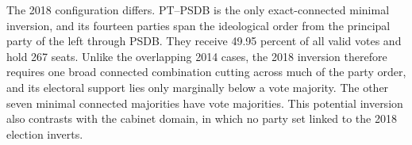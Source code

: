 \documentclass[11pt]{article}
\begin{document}

The 2018 configuration differs. PT--PSDB is the only exact-connected
minimal inversion, and its fourteen parties span the ideological order from
the principal party of the left through PSDB. They receive 49.95 percent of
all valid votes and hold 267 seats. Unlike the overlapping 2014 cases, the
2018 inversion therefore requires one broad connected combination cutting
across much of the party order, and its electoral support lies only marginally
below a vote majority. The other seven minimal connected majorities have vote
majorities. This potential inversion also contrasts with the  cabinet
domain, in which no party set linked to the 2018 election inverts.

\end{document}
